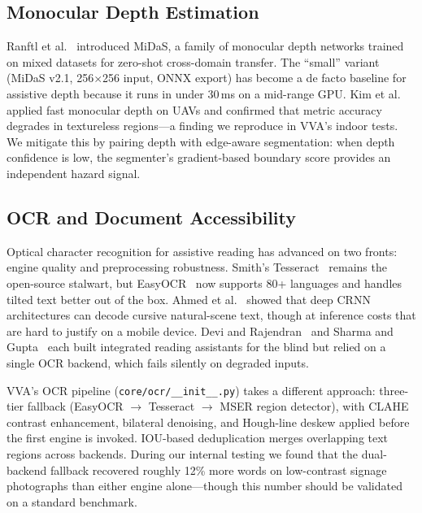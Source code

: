 \subsection{Monocular Depth Estimation}

Ranftl et al.~\cite{ranftl2020midas} introduced MiDaS, a family of monocular depth networks trained on mixed datasets for zero-shot cross-domain transfer. The ``small'' variant (MiDaS v2.1, 256${\times}$256 input, ONNX export) has become a de facto baseline for assistive depth because it runs in under 30\,ms on a mid-range GPU. Kim et al.~\cite{obstacle_avoidance_uav_depth2022} applied fast monocular depth on UAVs and confirmed that metric accuracy degrades in textureless regions---a finding we reproduce in VVA's indoor tests. We mitigate this by pairing depth with edge-aware segmentation: when depth confidence is low, the segmenter's gradient-based boundary score provides an independent hazard signal.

\subsection{OCR and Document Accessibility}

Optical character recognition for assistive reading has advanced on two fronts: engine quality and preprocessing robustness. Smith's Tesseract~\cite{smith2007tesseract} remains the open-source stalwart, but EasyOCR~\cite{jaided2020easyocr} now supports 80+ languages and handles tilted text better out of the box. Ahmed et al.~\cite{cursive_text_recognition_crnn2020} showed that deep CRNN architectures can decode cursive natural-scene text, though at inference costs that are hard to justify on a mobile device. Devi and Rajendran~\cite{ocr_integrated_assistive2023} and Sharma and Gupta~\cite{reading_assistant_blind_ai2022} each built integrated reading assistants for the blind but relied on a single OCR backend, which fails silently on degraded inputs.

VVA's OCR pipeline (\texttt{core/ocr/\_\_init\_\_.py}) takes a different approach: three-tier fallback (EasyOCR $\to$ Tesseract $\to$ MSER region detector), with CLAHE contrast enhancement, bilateral denoising, and Hough-line deskew applied before the first engine is invoked. IOU-based deduplication merges overlapping text regions across backends. During our internal testing we found that the dual-backend fallback recovered roughly 12\% more words on low-contrast signage photographs than either engine alone---though this number should be validated on a standard benchmark.

